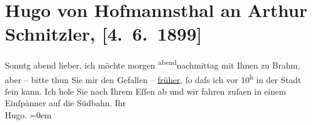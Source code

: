 

         
         \renewcommand{\erwaehntePersonen}{Personen: Otto Brahm}
         \renewcommand{\erwaehnteOrte}{Orte: Südbahnhof, Wien}
         \renewcommand{\erwaehnteWerke}{}
               \section[Hugo von Hofmannsthal an Arthur Schnitzler, {[}4. 6. 1899{]}]{ Hugo von Hofmannsthal an Arthur Schnitzler, {[}4. 6. 1899{]}}\nopagebreak{}\rehead{ }\begin{ledgroupsized}[t]{13cm}\normalsize\beginnumbering \toendnotes[C]{\smallbreak\pagebreak[2]} 
\pstart
           \raggedleft{}{\pb}Sonntg abend\pend
           \pstart
           lieber, ich möchte morgen \substVorne{}\textsuperscript{abend}\substDazwischen{}nachmittag\substHinten{} mit Ihnen zu Brahm, aber – bitte
                    thun Sie mir den Gefallen – \uline{früher}, ſo daſs ich
                    vor 10\textsuperscript{h} in der Stadt ſein kann. Ich hole Sie nach Ihrem Eſſen ab und wir fahren
                        zuſa{\geminationm}en in einem Einſpänner auf die Südbahn.\pend
           \pstart
           Ihr{\\[\baselineskip]}\spacefill\mbox{Hugo.}\pend
           \leftskip=0em{}
         
         \endnumbering{}\end{ledgroupsized}  \newcommand{\dateiname}{L00922}\newcommand{\titel}{Hugo von Hofmannsthal an Arthur Schnitzler, [4. 6. 1899]}\newcommand{\editorInnen}{Martin Anton Müller und Gerd-Hermann Susen}
      